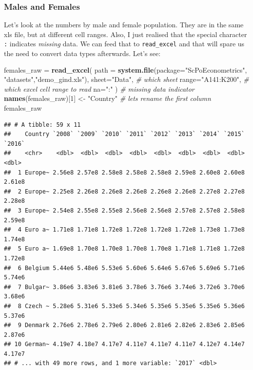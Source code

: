 \documentclass[]{book}
\newenvironment{Shaded}{\begin{snugshade}}{\end{snugshade}}
\newcommand{\KeywordTok}[1]{\textcolor[rgb]{0.13,0.29,0.53}{\textbf{#1}}}
\newcommand{\DataTypeTok}[1]{\textcolor[rgb]{0.13,0.29,0.53}{#1}}
\newcommand{\DecValTok}[1]{\textcolor[rgb]{0.00,0.00,0.81}{#1}}
\newcommand{\StringTok}[1]{\textcolor[rgb]{0.31,0.60,0.02}{#1}}
\newcommand{\CommentTok}[1]{\textcolor[rgb]{0.56,0.35,0.01}{\textit{#1}}}
\newcommand{\NormalTok}[1]{#1}
\theoremstyle{definition}
\theoremstyle{definition}
\theoremstyle{definition}
\theoremstyle{remark}
\begin{document}
\subsubsection*{Males and Females}\label{males-and-females}

Let's look at the numbers by male and female population. They are in the
same xls file, but at different cell ranges. Also, I just realised that
the special character \texttt{:} indicates \emph{missing} data. We can
feed that to \texttt{read\_excel} and that will spare us the need to
convert data types afterwards. Let's see:

\begin{Shaded}
\begin{Highlighting}[]
\NormalTok{females_raw =}\StringTok{ }\KeywordTok{read_excel}\NormalTok{(}
                \DataTypeTok{path =} \KeywordTok{system.file}\NormalTok{(}\DataTypeTok{package=}\StringTok{"ScPoEconometrics"}\NormalTok{,}
                                    \StringTok{"datasets"}\NormalTok{,}\StringTok{"demo_gind.xls"}\NormalTok{), }
                \DataTypeTok{sheet=}\StringTok{"Data"}\NormalTok{, }\CommentTok{# which sheet}
                \DataTypeTok{range=}\StringTok{"A141:K200"}\NormalTok{,  }\CommentTok{# which excel cell range to read}
                \DataTypeTok{na=}\StringTok{":"}\NormalTok{ )   }\CommentTok{# missing data indicator}
\KeywordTok{names}\NormalTok{(females_raw)[}\DecValTok{1}\NormalTok{] <-}\StringTok{ "Country"}   \CommentTok{# lets rename the first column}
\NormalTok{females_raw}
\end{Highlighting}
\end{Shaded}

\begin{verbatim}
## # A tibble: 59 x 11
##    Country `2008` `2009` `2010` `2011` `2012` `2013` `2014` `2015` `2016`
##    <chr>    <dbl>  <dbl>  <dbl>  <dbl>  <dbl>  <dbl>  <dbl>  <dbl>  <dbl>
##  1 Europe~ 2.56e8 2.57e8 2.58e8 2.58e8 2.58e8 2.59e8 2.60e8 2.60e8 2.61e8
##  2 Europe~ 2.25e8 2.26e8 2.26e8 2.26e8 2.26e8 2.26e8 2.27e8 2.27e8 2.28e8
##  3 Europe~ 2.54e8 2.55e8 2.55e8 2.56e8 2.56e8 2.57e8 2.57e8 2.58e8 2.59e8
##  4 Euro a~ 1.71e8 1.71e8 1.72e8 1.72e8 1.72e8 1.72e8 1.73e8 1.73e8 1.74e8
##  5 Euro a~ 1.69e8 1.70e8 1.70e8 1.70e8 1.70e8 1.71e8 1.71e8 1.72e8 1.72e8
##  6 Belgium 5.44e6 5.48e6 5.53e6 5.60e6 5.64e6 5.67e6 5.69e6 5.71e6 5.74e6
##  7 Bulgar~ 3.86e6 3.83e6 3.81e6 3.78e6 3.76e6 3.74e6 3.72e6 3.70e6 3.68e6
##  8 Czech ~ 5.28e6 5.31e6 5.33e6 5.34e6 5.35e6 5.35e6 5.35e6 5.36e6 5.37e6
##  9 Denmark 2.76e6 2.78e6 2.79e6 2.80e6 2.81e6 2.82e6 2.83e6 2.85e6 2.87e6
## 10 German~ 4.19e7 4.18e7 4.17e7 4.11e7 4.11e7 4.11e7 4.12e7 4.14e7 4.17e7
## # ... with 49 more rows, and 1 more variable: `2017` <dbl>
\end{verbatim}
\end{document}
